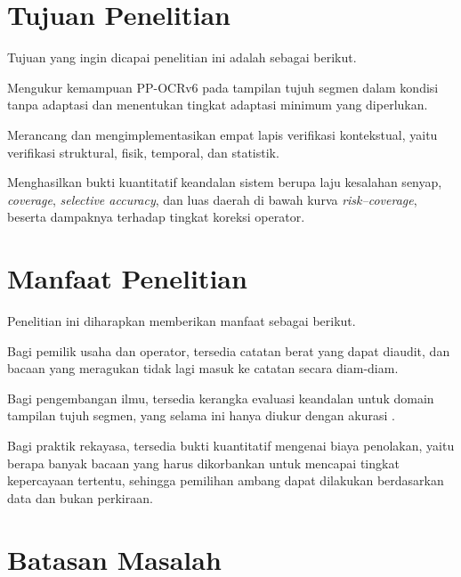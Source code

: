 \section{Tujuan Penelitian}

Tujuan yang ingin dicapai penelitian ini adalah sebagai berikut.
\begin{poin}
  \item Mengukur kemampuan PP-OCRv6 pada tampilan tujuh segmen dalam kondisi
        tanpa adaptasi dan menentukan tingkat adaptasi minimum yang diperlukan.
  \item Merancang dan mengimplementasikan empat lapis verifikasi kontekstual,
        yaitu verifikasi struktural, fisik, temporal, dan statistik.
  \item Menghasilkan bukti kuantitatif keandalan sistem berupa laju kesalahan
        senyap, \textit{coverage}, \textit{selective accuracy}, dan luas daerah
        di bawah kurva \textit{risk--coverage}, beserta dampaknya terhadap
        tingkat koreksi operator.
\end{poin}

\section{Manfaat Penelitian}

Penelitian ini diharapkan memberikan manfaat sebagai berikut.
\begin{poin}
  \item Bagi pemilik usaha dan operator, tersedia catatan berat yang dapat
        diaudit, dan bacaan yang meragukan tidak lagi masuk ke catatan secara
        diam-diam.
  \item Bagi pengembangan ilmu, tersedia kerangka evaluasi keandalan untuk
        domain tampilan tujuh segmen, yang selama ini hanya diukur dengan
        akurasi \parencite{effendi2025unjuk,gushima2023automatic,yenneti2023lightweight}.
  \item Bagi praktik rekayasa, tersedia bukti kuantitatif mengenai biaya
        penolakan, yaitu berapa banyak bacaan yang harus dikorbankan untuk
        mencapai tingkat kepercayaan tertentu, sehingga pemilihan ambang dapat
        dilakukan berdasarkan data dan bukan perkiraan.
\end{poin}

\section{Batasan Masalah}

